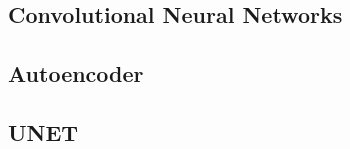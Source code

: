 








\subsection{Convolutional Neural Networks}
\subsection{Autoencoder}
\cite{goodfellowDeepLearning2016}
\subsection{UNET}



